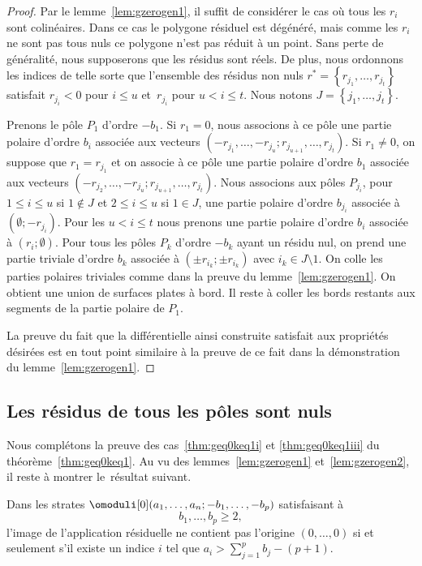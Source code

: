 \begin{proof}
Par le lemme~\ref{lem:gzerogen1}, il suffit de considérer le cas où tous les $r_{i}$ sont colinéaires. Dans ce cas le polygone résiduel est dégénéré, mais comme les $r_{i}$ ne sont pas tous nuls ce polygone n'est pas réduit à un point. Sans perte de généralité, nous supposerons que les résidus sont réels. De plus, nous ordonnons les indices de telle sorte que l'ensemble des résidus non nuls $r^{\ast}=\left\{ r_{j_{1}},\dots,r_{j_{t}}\right\}$ satisfait $r_{j_{i}}<0$ pour $i\leq u$ et~$r_{j_{i}}$ pour $u<i\leq t$. Nous notons $J=\left\{ j_{1},\dots,j_{t}\right\}$.

Prenons le pôle $P_{1}$ d'ordre $-b_{1}$. Si $r_{1}=0$, nous associons à ce pôle une partie polaire d'ordre $b_{i}$ associée aux vecteurs $(-r_{j_{1}},\dots,-r_{j_{u}};r_{j_{u+1}},\dots,r_{j_{t}})$. Si $r_{1}\neq 0$, on suppose que $r_{1}=r_{j_{1}}$ et on associe à ce pôle une partie polaire d'ordre $b_{1}$ associée aux vecteurs $(-r_{j_{2}},\dots,-r_{j_{u}};r_{j_{u+1}},\dots,r_{j_{t}})$.
Nous associons aux pôles $P_{j_{i}}$, pour $1\leq i\leq u$ si $1\notin J$ et $2\leq i\leq u$ si $1\in J$, une partie polaire d'ordre $b_{j_{i}}$ associée à $(\emptyset;-r_{j_{i}})$. Pour les $u< i\leq t$ nous prenons une partie polaire d'ordre $b_{i}$ associée à $(r_{i};\emptyset)$. Pour tous les pôles $P_{k}$ d'ordre $-b_{k}$ ayant un résidu nul, on prend une partie triviale d'ordre $b_{k}$ associée à $(\pm r_{i_{k}};\pm r_{i_{k}})$ avec $i_{k}\in J \setminus 1$. On colle les parties polaires triviales comme dans la preuve du lemme~\ref{lem:gzerogen1}. On obtient une union de surfaces plates à bord. Il reste à coller les bords restants aux segments de la partie polaire de $P_{1}$.

La preuve du fait que la différentielle ainsi construite satisfait aux propriétés désirées est en tout point similaire à la preuve de ce fait dans la démonstration du lemme~\ref{lem:gzerogen1}.
\end{proof}

\subsection{Les résidus de tous les pôles sont nuls}
\label{sec:casreszero}
Nous complétons la preuve des cas~\eqref{thm:geq0keq1i} et \eqref{thm:geq0keq1iii} du théorème~\ref{thm:geq0keq1}. Au vu des lemmes~\ref{lem:gzerogen1} et~\ref{lem:gzerogen2}, il reste à montrer le~résultat suivant.
\begin{lem}\label{lem:condgzero}
Dans les strates $\omoduli[0](a_{1},\dots,a_{n};-b_{1},\dots,-b_{p})$ satisfaisant à
\[
b_{1},\dots,b_{p} \geq 2,
\]
l'image de l'application résiduelle ne contient pas l'origine $(0,\dots,0)$ si et seulement s'il existe un indice $i$ tel que $a_{i}>\sum_{j=1}^{p}b_{j}-(p+1)$.
\end{lem}

